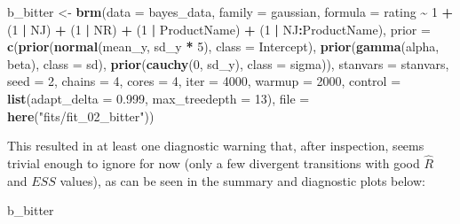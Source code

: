 \documentclass[
]{book}
\newenvironment{Shaded}{\begin{snugshade}}{\end{snugshade}}
\newcommand{\AttributeTok}[1]{\textcolor[rgb]{0.13,0.29,0.53}{#1}}
\newcommand{\DecValTok}[1]{\textcolor[rgb]{0.00,0.00,0.81}{#1}}
\newcommand{\FloatTok}[1]{\textcolor[rgb]{0.00,0.00,0.81}{#1}}
\newcommand{\FunctionTok}[1]{\textcolor[rgb]{0.13,0.29,0.53}{\textbf{#1}}}
\newcommand{\NormalTok}[1]{#1}
\newcommand{\OtherTok}[1]{\textcolor[rgb]{0.56,0.35,0.01}{#1}}
\newcommand{\SpecialCharTok}[1]{\textcolor[rgb]{0.81,0.36,0.00}{\textbf{#1}}}
\newcommand{\StringTok}[1]{\textcolor[rgb]{0.31,0.60,0.02}{#1}}
\begin{document}
\begin{Shaded}
\begin{Highlighting}[]
\NormalTok{b\_bitter }\OtherTok{\textless{}{-}} 
  \FunctionTok{brm}\NormalTok{(}\AttributeTok{data =}\NormalTok{ bayes\_data,}
      \AttributeTok{family =}\NormalTok{ gaussian,}
      \AttributeTok{formula =}\NormalTok{ rating }\SpecialCharTok{\textasciitilde{}} \DecValTok{1} \SpecialCharTok{+}\NormalTok{ (}\DecValTok{1} \SpecialCharTok{|}\NormalTok{ NJ) }\SpecialCharTok{+}\NormalTok{ (}\DecValTok{1} \SpecialCharTok{|}\NormalTok{ NR) }\SpecialCharTok{+}\NormalTok{ (}\DecValTok{1} \SpecialCharTok{|}\NormalTok{ ProductName) }\SpecialCharTok{+}\NormalTok{ (}\DecValTok{1} \SpecialCharTok{|}\NormalTok{ NJ}\SpecialCharTok{:}\NormalTok{ProductName),}
      \AttributeTok{prior =} \FunctionTok{c}\NormalTok{(}\FunctionTok{prior}\NormalTok{(}\FunctionTok{normal}\NormalTok{(mean\_y, sd\_y }\SpecialCharTok{*} \DecValTok{5}\NormalTok{), }\AttributeTok{class =}\NormalTok{ Intercept),}
                \FunctionTok{prior}\NormalTok{(}\FunctionTok{gamma}\NormalTok{(alpha, beta), }\AttributeTok{class =}\NormalTok{ sd),}
                \FunctionTok{prior}\NormalTok{(}\FunctionTok{cauchy}\NormalTok{(}\DecValTok{0}\NormalTok{, sd\_y), }\AttributeTok{class =}\NormalTok{ sigma)),}
      \AttributeTok{stanvars =}\NormalTok{ stanvars, }\AttributeTok{seed =} \DecValTok{2}\NormalTok{, }\AttributeTok{chains =} \DecValTok{4}\NormalTok{, }\AttributeTok{cores =} \DecValTok{4}\NormalTok{, }\AttributeTok{iter =} \DecValTok{4000}\NormalTok{,}
      \AttributeTok{warmup =} \DecValTok{2000}\NormalTok{, }\AttributeTok{control =} \FunctionTok{list}\NormalTok{(}\AttributeTok{adapt\_delta =} \FloatTok{0.999}\NormalTok{, }\AttributeTok{max\_treedepth =} \DecValTok{13}\NormalTok{),}
      \AttributeTok{file =} \FunctionTok{here}\NormalTok{(}\StringTok{"fits/fit\_02\_bitter"}\NormalTok{))}
\end{Highlighting}
\end{Shaded}

This resulted in at least one diagnostic warning that, after inspection, seems trivial enough to ignore for now (only a few divergent transitions with good \(\hat{R}\) and \(ESS\) values), as can be seen in the summary and diagnostic plots below:

\begin{Shaded}
\begin{Highlighting}[]
\NormalTok{b\_bitter}
\end{Highlighting}
\end{Shaded}
\end{document}
